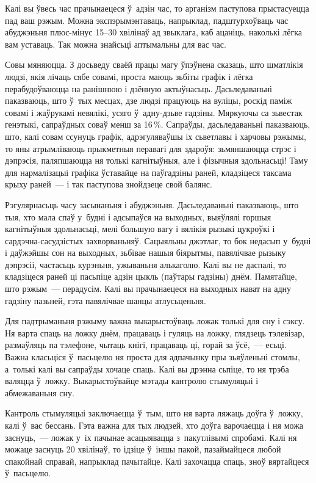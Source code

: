 Калі вы ўвесь час прачынаецеся ў~адзін час, то арганізм паступова прыстасуецца пад ваш рэжым. Можна экспэрымэнтаваць, напрыклад, падштурхоўваць час абуджэньня плюс-мінус 15--30 хвілінаў ад звыклага, каб ацаніць, наколькі лёгка вам уставаць. Так можна знайсьці аптымальны для вас час.

Совы мяняюцца. З досьведу сваёй працы магу ўпэўнена сказаць, што шматлікія людзі, якія лічаць сябе совамі, проста маюць зьбіты графік і лёгка перабудоўваюцца на ранішнюю і дзённую актыўнасьць. Дасьледаваньні паказваюць, што ў~тых месцах, дзе людзі працуюць на вуліцы, роскід паміж совамі і жаўрукамі невялікі, усяго ў~адну-дзьве гадзіны. Мяркуючы са зьвестак генэтыкі, сапраўдных соваў менш за 16\,\%. Сапраўды, дасьледаваньні паказваюць, што, калі совам ссунуць графік, адрэгуляваўшы іх сьветлавы і харчовы рэжымы, то яны атрымліваюць прыкметныя перавагі для здароўя: зьмяншаюцца стрэс і дэпрэсія, паляпшаюцца ня толькі кагнітыўныя, але і фізычныя здольнасьці! Таму для нармалізацыі графіка ўставайце на паўгадзіны раней, кладзіцеся таксама крыху раней~--- і так паступова знойдзеце свой балянс.

Рэгулярнасьць часу засынаньня і абуджэньня. Дасьледаваньні паказваюць, што тыя, хто мала спаў у~будні і адсыпаўся на выходных, выяўлялі горшыя кагнітыўныя здольнасьці, мелі большую вагу і вялікія рызыкі цукроўкі і сардэчна-сасудзістых захворваньняў. Сацыяльны джэтлаг, то бок недасып у~будні і даўжэйшы сон на выходных, зьбівае нашыя біярытмы, павялічвае рызыку дэпрэсіі, частасьць курэньня, ужываньня алькаголю. Калі вы не даспалі, то кладзіцеся раней ці пасьпіце адзін цыкль (паўтары гадзіны) днём. Памятайце, што рэжым~--- перадусім. Калі вы прачынаецеся на выходных нават на адну гадзіну пазьней, гэта павялічвае шанцы атлусьценьня.

Для падтрыманьня рэжыму важна выкарыстоўваць ложак толькі для сну і сэксу. Ня варта спаць на ложку днём, працаваць і гуляць на ложку, глядзець тэлевізар, размаўляць па тэлефоне, чытаць кнігі, працаваць ці, горай за ўсё,~--- есьці. Важна класьціся ў~пасьцелю ня проста для адпачынку пры зьяўленьні стомлы, а~толькі калі вы сапраўды хочаце спаць. Калі вы дрэнна сьпіце, то ня трэба валяцца ў~ложку. Выкарыстоўвайце мэтады кантролю стымуляцыі і абмежаваньня сну.

Кантроль стымуляцыі заключаецца ў~тым, што ня варта ляжаць доўга ў~ложку, калі ў~вас бессань. Гэта важна для тых людзей, хто доўга варочаецца і ня можа заснуць,~--- ложак у~іх пачынае асацыявацца з~пакутлівымі спробамі. Калі ня можаце заснуць 20 хвілінаў, то ідзіце ў~іншы пакой, пазаймайцеся любой спакойнай справай, напрыклад пачытайце. Калі захочацца спаць, зноў вяртайцеся ў~пасьцелю.

